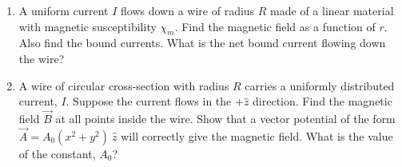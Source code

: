 \documentclass[fleqn]{article}
\begin{document}
\begin{enumerate}
    \item A uniform current $I$ flows down a wire of radius $R$ made of a linear material with magnetic susceptibility $\chi_m$. Find the 
    magnetic field as a function of $r$. Also find the bound currents. What is the net bound current flowing down the wire?


    \item A wire of circular cross-section with radius $R$ carries a uniformly distributed current, $I$. Suppose the current flows in the $+\hat{z}$ direction.
    Find the magnetic field $\overrightarrow{B}$ at all points inside the wire. Show that a vector potential of the form 
    $\overrightarrow{A}=A_0 \left(x^2+y^2\right) ~ \hat{z}$ will correctly give the
    magnetic field. What is the value of the constant, $A_0$?


\end{enumerate}
\end{document}
